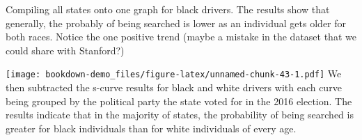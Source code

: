 \documentclass[
]{book}
\newenvironment{Shaded}{\begin{snugshade}}{\end{snugshade}}
\newcommand{\ControlFlowTok}[1]{\textcolor[rgb]{0.13,0.29,0.53}{\textbf{#1}}}
\newcommand{\DataTypeTok}[1]{\textcolor[rgb]{0.13,0.29,0.53}{#1}}
\newcommand{\DecValTok}[1]{\textcolor[rgb]{0.00,0.00,0.81}{#1}}
\newcommand{\KeywordTok}[1]{\textcolor[rgb]{0.13,0.29,0.53}{\textbf{#1}}}
\newcommand{\NormalTok}[1]{#1}
\newcommand{\OperatorTok}[1]{\textcolor[rgb]{0.81,0.36,0.00}{\textbf{#1}}}
\newcommand{\StringTok}[1]{\textcolor[rgb]{0.31,0.60,0.02}{#1}}
\begin{document}
Compiling all states onto one graph for black drivers. The results show that generally, the probably of being searched is lower as an individual gets older for both races. Notice the one positive trend (maybe a mistake in the dataset that we could share with Stanford?)

\begin{Shaded}
\end{Shaded}

\texttt{[image: bookdown-demo\_files/figure-latex/unnamed-chunk-43-1.pdf]}
We then subtracted the s-curve results for black and white drivers with each curve being grouped by the political party the state voted for in the 2016 election. The results indicate that in the majority of states, the probability of being searched is greater for black individuals than for white individuals of every age.
\end{document}
